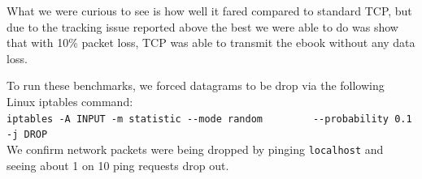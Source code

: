 \documentclass[conference]{IEEEtran}
\theoremstyle{definition}
\begin{document}
What we were curious to see is how well it fared compared
to standard TCP, but due to the tracking issue reported
above the best we were able to do was show that with
10\% packet loss, TCP was able to transmit the ebook
without any data loss.

To run these benchmarks, we forced datagrams to be
drop via the following Linux iptables command:\\

{\small\verb+iptables -A INPUT -m statistic --mode random+}
{\small\verb+        --probability 0.1 -j DROP+}\\

We confirm network packets were being dropped by pinging
\verb+localhost+ and seeing about 1 on 10 ping requests
drop out.




%
%



%
%
\end{document}
